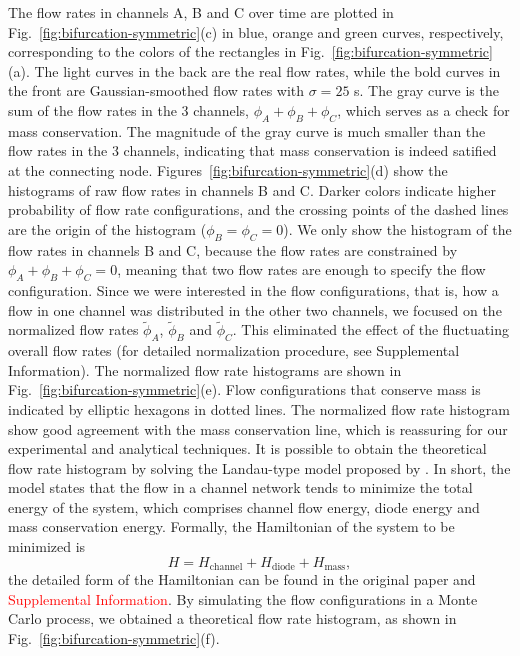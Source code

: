 \documentclass[%
10pt,
superscriptaddress,
twocolumn,
 amsmath,amssymb,
 aps,prx,
]{revtex4-2}
\newcommand{\red}[1]{\textcolor{red}{#1}}
\begin{document}
The flow rates in channels A, B and C over time are plotted in Fig.~\ref{fig:bifurcation-symmetric}(c) in blue, orange and green curves, respectively, corresponding to the colors of the rectangles in Fig.~\ref{fig:bifurcation-symmetric}(a).
The light curves in the back are the real flow rates, while the bold curves in the front are Gaussian-smoothed flow rates with $\sigma=25$ s.
The gray curve is the sum of the flow rates in the 3 channels, $\phi_A+\phi_B+\phi_C$, which serves as a check for mass conservation.
The magnitude of the gray curve is much smaller than the flow rates in the 3 channels, indicating that mass conservation is indeed satified at the connecting node.
Figures~\ref{fig:bifurcation-symmetric}(d) show the histograms of raw flow rates in channels B and C.
Darker colors indicate higher probability of flow rate configurations, and the crossing points of the dashed lines are the origin of the histogram ($\phi_B=\phi_C=0$).
We only show the histogram of the flow rates in channels B and C, because the flow rates are constrained by $\phi_A+\phi_B+\phi_C=0$, meaning that two flow rates are enough to specify the flow configuration.
Since we were interested in the flow configurations, that is, how a flow in one channel was distributed in the other two channels, we focused on the normalized flow rates $\tilde\phi_A$, $\tilde\phi_B$ and $\tilde\phi_C$.
This eliminated the effect of the fluctuating overall flow rates (for detailed normalization procedure, see Supplemental Information).
The normalized flow rate histograms are shown in Fig.~\ref{fig:bifurcation-symmetric}(e).
Flow configurations that conserve mass is indicated by elliptic hexagons in dotted lines.
The normalized flow rate histogram show good agreement with the mass conservation line, which is reassuring for our experimental and analytical techniques.
It is possible to obtain the theoretical flow rate histogram by solving the Landau-type model proposed by \citet{Woodhouse2017}.
In short, the model states that the flow in a channel network tends to minimize the total energy of the system, which comprises channel flow energy, diode energy and mass conservation energy.
Formally, the Hamiltonian of the system to be minimized is
%
\begin{equation}
    H = H_{\mathrm{channel}} + H_{\mathrm{diode}} + H_{\mathrm{mass}},
\end{equation}
%
the detailed form of the Hamiltonian can be found in the original paper \cite{Woodhouse2017} and \red{Supplemental Information}.
By simulating the flow configurations in a Monte Carlo process, we obtained a theoretical flow rate histogram, as shown in Fig.~\ref{fig:bifurcation-symmetric}(f).
\end{document}
